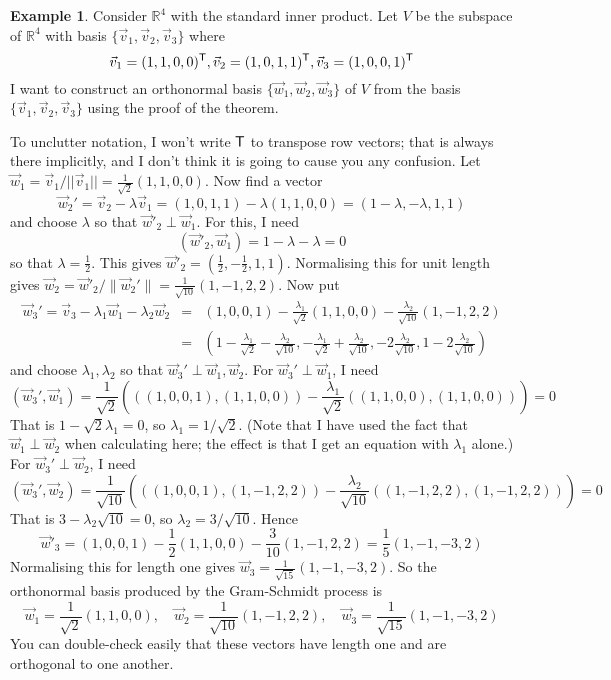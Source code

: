 \documentclass[11pt]{amsbook}
\theoremstyle{definition}
\newtheorem{ex}[theorem]{Example}
\begin{document}
\begin{ex}
Consider $\mathbb{R}^4$ with the standard inner product. Let $V$ be the subspace of $\mathbb{R}^4$ with basis $\{ \vec{v}_1, \vec{v}_2, \vec{v}_3 \}$ where $$\vec{v}_1 = (1,1,0,0)^{\sf T}, \vec{v}_2 = (1,0,1,1)^{\sf T}, \vec{v}_3 = (1,0,0,1)^{\sf T}$$
I want to construct an orthonormal basis $\{ \vec{w}_1, \vec{w}_2, \vec{w}_3\}$ of $V$ from the basis $\{ \vec{v}_1, \vec{v}_2, \vec{v}_3 \}$ using the proof of the theorem.

To unclutter notation, I won't write $\sf T$ to transpose row vectors; that is always there implicitly, and I don't think it is going to cause you any confusion. Let $\vec{w}_1 = \vec{v}_1/ ||\vec{v}_1 || = \frac{1}{\sqrt{2}}(1,1,0,0)$. Now find a vector $$\vec{w}_2' = \vec{v}_2 - \lambda \vec{v}_1 = (1,0,1,1) - {\lambda} (1,1,0,0) = (1 - {\lambda}, - {\lambda}, 1,1)$$ and choose $\lambda$ so that $\vec{w}'_2 \perp \vec{w}_1$. For this, I need $$( \vec{w}'_2, \vec{w}_1) = 1- {\lambda} - {\lambda} = 0$$ so that $\lambda = \frac{1}{{2}}$. This gives $\vec{w}'_2 = (\frac{1}{2}, -\frac{1}{2}, 1, 1)$. Normalising this for unit length gives $\vec{w}_2 = \vec{w}'_2/\|\vec{w}_2'\| = \frac{1}{\sqrt{10}}(1,-1, 2,2)$. Now put \begin{eqnarray*} \vec{w}_3' = \vec{v}_3 - \lambda_1 \vec{w}_1 - \lambda_2 \vec{w}_2 &=& (1,0,0,1) - \frac{\lambda_1}{\sqrt{2}} (1,1,0,0) - \frac{\lambda_2}{\sqrt{10}} (1,-1,2,2) \\ & =& (1 - \frac{\lambda_1}{\sqrt{2}} - \frac{\lambda_2}{\sqrt{10}}, -\frac{\lambda_1}{\sqrt{2}}+ \frac{\lambda_2}{\sqrt{10}}, - 2\frac{\lambda_2}{\sqrt{10}}, 1 - 2\frac{\lambda_2}{\sqrt{10}})\end{eqnarray*} and choose $\lambda_1, \lambda_2$ so that $\vec{w}_3'\perp \vec{w}_1, \vec{w}_2$. For $\vec{w}_3'\perp \vec{w}_1$, I need $$( \vec{w}_3', \vec{w}_1 ) = \frac{1}{\sqrt{2}}\left(((1,0,0,1),(1,1,0,0)) - \frac{\lambda_1}{\sqrt{2}} ((1,1,0,0), (1,1,0,0))\right) = 0$$ That is $1- \sqrt{2}\lambda_1 = 0$, so $\lambda_1 = 1/\sqrt{2}$. (Note that I have used the fact that $\vec{w}_1\perp \vec{w}_2$ when calculating here; the effect is that I get an equation with $\lambda_1$ alone.) For $\vec{w}_3'\perp \vec{w}_2$, I need
$$(\vec{w}_3', \vec{w}_2) = \frac{1}{\sqrt{10}} \left(( (1,0,0,1) , (1,-1,2,2) ) - \frac{\lambda_2}{\sqrt{10}} ( (1,-1,2,2), (1,-1,2,2) ) \right) = 0$$
That is $3 - \lambda_2\sqrt{10}=0$, so $\lambda_2 = 3/\sqrt{10}$. Hence $$\vec{w}'_3 = (1,0,0,1) - \frac{1}{2}(1,1,0,0) - \frac{3}{10}(1,-1,2,2) = \frac{1}{5}(1,-1,-3,2)$$ Normalising this for length one gives $\vec{w}_3 = \frac{1}{\sqrt{15}}(1,-1,-3,2)$. So the orthonormal basis produced by the Gram-Schmidt process is $$\vec{w}_1 =  \frac{1}{\sqrt{2}}(1,1,0,0),\quad \vec{w}_2 =  \frac{1}{\sqrt{10}}(1,-1, 2,2), \quad \vec{w}_3 = \frac{1}{\sqrt{15}}(1,-1,-3,2)$$ You can double-check easily that these vectors have length one and are orthogonal to one another.


\end{ex}
\end{document}
